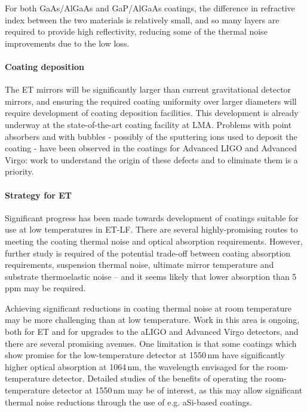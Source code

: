 For both GaAs/AlGaAs and GaP/AlGaAs coatings, the difference in refractive index between the two materials is relatively small, and so many layers are required to provide high reflectivity, reducing some of the thermal noise improvements due to the low loss.

\paragraph{Coating deposition}
The ET mirrors will be significantly larger than current gravitational detector mirrors, and ensuring the required coating uniformity over larger diameters will require development of coating deposition facilities. This development is already underway at the state-of-the-art coating facility at LMA. Problems with point absorbers and with bubbles - possibly of the sputtering ions used to deposit the coating - have been observed in the coatings for Advanced LIGO and Advanced Virgo: work to understand the origin of these defects and to eliminate them is a priority. 

\paragraph{Strategy for ET}

Significant progress has been made towards development of coatings suitable for use at low temperatures in ET-LF. There are several highly-promising routes to meeting the coating thermal noise and optical absorption requirements. However, further study is required of the potential trade-off between coating absorption requirements, suspension thermal noise, ultimate mirror temperature and substrate thermoelastic noise -- and it seems likely that lower absorption than 5\,ppm may be required.

Achieving significant reductions in coating thermal noise at room temperature may be more challenging than at low temperature. Work in this area is ongoing, both for ET and for upgrades to the aLIGO and Advanced Virgo detectors, and there are several promising avenues. One limitation is that some coatings which show promise for the low-temperature detector at 1550\,nm have significantly higher optical absorption at 1064\,nm, the wavelength envisaged for the room-temperature detector. Detailed studies of the benefits of operating the room-temperature detector at 1550\,nm may be of interest, as this may allow significant thermal noise reductions through the use of e.g. aSi-based coatings.

